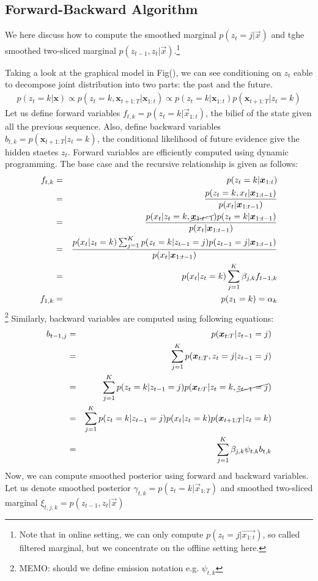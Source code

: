 \subsection{Forward-Backward Algorithm}
We here discuss how to compute the smoothed marginal $p(z_t = j| \vec{x})$ and tghe smoothed two-sliced marginal $p(z_{t-1},z_t| \vec{x})$.\footnote{Note that in online setting, we can only compute $p(z_t = j| \vec{x_{1:t}})$, so called filtered marginal, but we concentrate on the offline setting here.}

Taking a look at the graphical model in Fig(), we can see conditioning on $z_t$ eable to decompose joint distribution into two parts: the past and the future. 
\begin{eqnarray}
p(z_t= k| \mathbf{x}) \propto p(z_t=k, \mathbf{x}_{t+1:T}| \mathbf{x}_{1:t})  \propto p(z_t=k|\mathbf{x}_{1:t}) p(\mathbf{x}_{t+1:T}|z_t=k)
\end{eqnarray}
Let us define forward variables $f_{t,k} = p(z_t = k | \vec{x}_{1:t})$, the bilief of the state given all the previous sequence. 
Also, define backward variables $b_{t,k} = p(\mathbf{x}_{t+1:T}|z_t=k)$, the conditional likelihood of future evidence give the hidden staetes $z_t$.
Forward variables are efficiently computed using dynamic programming. The base case and the recursive relationship is given as follows:
\begin{eqnarray}
  f_{t,k} &=& p(z_t = k | \vec{x}_{1:t}) \nonumber \\
          &=& \frac{p(z_t = k, x_t|\vec{x}_{1:t-1})}  {p(x_t|\vec{x}_{1:t-1})} \nonumber \\  
          &=& \frac{p(x_t|z_t=k, \cancel{\vec{x}_{1:t-1}})p(z_t = k|\vec{x}_{1:t-1})}  {p(x_t|\vec{x}_{1:t-1})} \nonumber \\  
          &=& \frac{p(x_t|z_t=k) \sum_{j=1}^K p(z_t = k | z_{t-1} = j)p(z_{t-1} = j|\vec{x}_{1:t-1})}  {p(x_t|\vec{x}_{1:t-1})} \nonumber \\  
          &=& p(x_t| z_t = k) \sum_{j=1}^K  \beta_{j,k} f_{t-1,k} \\
  f_{1, k} &=& p(z_1 = k) = \alpha_k
\end{eqnarray}
\footnote{MEMO: should we define emission notation e.g. $\psi_{t,k}$}
Similarly, backward variables are computed using following equations:
\begin{eqnarray}
b_{t-1,j} &=& p(\vec{x}_{t:T}|z_{t-1}=j) \nonumber \\
          &=& \sum_{j=1}^K p(\vec{x}_{t:T}, z_{t}=j| z_{t-1}=j) \nonumber \\
          &=& \sum_{j=1}^K p(z_{t}=k| z_{t-1}=j) p(\vec{x}_{t:T}| z_t=k, \cancel{z_{t-1}=j}) \nonumber \\
          &=& \sum_{j=1}^K p(z_{t}=k| z_{t-1}=j) p(x_t|z_t=k) p(\vec{x}_{t+1:T}| z_t=k) \nonumber \\
          &=& \sum_{j=1}^K \beta_{j,k} \psi_{t,k} b_{t,k}  
\end{eqnarray}
Now, we can compute smoothed posterior using forward and backward variables. Let us denote smoothed posterior $\gamma_{t,k} = p(z_t = k|\vec{x}_{1:T})$ and smoothed two-sliced marginal $\xi_{t,j,k} = p(z_{t-1},z_t| \vec{x})$

